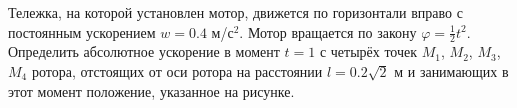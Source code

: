 Тележка, на которой установлен мотор, движется по горизонтали вправо
с постоянным ускорением $w = 0.4$ м/с$^2$.
Мотор вращается по закону $\varphi = \frac{1}{2}t^2$.
Определить абсолютное ускорение в момент $t = 1$ с четырёх точек
$M_1$, $M_2$, $M_3$, $M_4$ ротора,
отстоящих от оси ротора на расстоянии $l = 0.2\sqrt{2}$ м
и занимающих в этот момент положение, указанное на рисунке.
